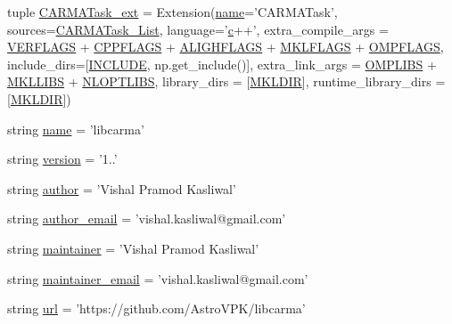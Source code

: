\begin{DoxyCompactItemize}
tuple \hyperlink{namespacesetup_ab526aa988f441f3a58795affc1d3b7de}{C\-A\-R\-M\-A\-Task\-\_\-ext} = Extension(\hyperlink{namespacesetup_a61de3710bf6c9d78c0afa352263f8b09}{name}='C\-A\-R\-M\-A\-Task', sources=\hyperlink{namespacesetup_aae98c7021359c0fe9ff337761d5c1dc5}{C\-A\-R\-M\-A\-Task\-\_\-\-List}, language='\hyperlink{_constants_8cpp_a2c09e929a6ea340fc9653cca414b11d3}{c}++', extra\-\_\-compile\-\_\-args = \hyperlink{namespacesetup_a4b1725ffabf7e972e9416fc047daa758}{V\-E\-R\-F\-L\-A\-G\-S} + \hyperlink{namespacesetup_a94afbb2834cc36eb3a362aec00c4f0bb}{C\-P\-P\-F\-L\-A\-G\-S} + \hyperlink{namespacesetup_ad6de2d2793e8dad016a00e201563ff15}{A\-L\-I\-G\-H\-F\-L\-A\-G\-S} + \hyperlink{namespacesetup_a356d52830aa81f3e0cfda1095f3162f8}{M\-K\-L\-F\-L\-A\-G\-S} + \hyperlink{namespacesetup_aa0d1a93d0a5a5a10a02c0cac8dbcaa02}{O\-M\-P\-F\-L\-A\-G\-S}, include\-\_\-dirs=\mbox{[}\hyperlink{namespacesetup_acf0d303c559d8ca52f78fb7970b2de4d}{I\-N\-C\-L\-U\-D\-E}, np.\-get\-\_\-include()\mbox{]}, extra\-\_\-link\-\_\-args = \hyperlink{namespacesetup_aad0176b2380288a025c0c71db934ee2d}{O\-M\-P\-L\-I\-B\-S} + \hyperlink{namespacesetup_a3ecd92f8e1e53dd6528359a08aee59e9}{M\-K\-L\-L\-I\-B\-S} + \hyperlink{namespacesetup_ae8e55c011b0f75d872a51166b37395ae}{N\-L\-O\-P\-T\-L\-I\-B\-S}, library\-\_\-dirs = \mbox{[}\hyperlink{namespacesetup_a71664edfdcf98a1ed2159a5cb4a7d196}{M\-K\-L\-D\-I\-R}\mbox{]}, runtime\-\_\-library\-\_\-dirs = \mbox{[}\hyperlink{namespacesetup_a71664edfdcf98a1ed2159a5cb4a7d196}{M\-K\-L\-D\-I\-R}\mbox{]})
\item 
string \hyperlink{namespacesetup_a61de3710bf6c9d78c0afa352263f8b09}{name} = 'libcarma'
\item 
string \hyperlink{namespacesetup_ab177531e7a80674a3db3de2d79eb8be7}{version} = '1..'
\item 
string \hyperlink{namespacesetup_ac83393287a89728d636e4ae9f4ac914f}{author} = 'Vishal Pramod Kasliwal'
\item 
string \hyperlink{namespacesetup_aa144ac52ed417d5c65d7377e0e75673e}{author\-\_\-email} = 'vishal.\-kasliwal@gmail.\-com'
\item 
string \hyperlink{namespacesetup_a2d2b97e05b2ec934a59e56cfc0566e8b}{maintainer} = 'Vishal Pramod Kasliwal'
\item 
string \hyperlink{namespacesetup_a722cbcdb0d00c919cbbdd9ffafc96e74}{maintainer\-\_\-email} = 'vishal.\-kasliwal@gmail.\-com'
\item 
string \hyperlink{namespacesetup_a3376e8b9735800b5b9e455914cee908d}{url} = 'https\-://github.\-com/Astro\-V\-P\-K/libcarma'

\end{DoxyCompactItemize}
